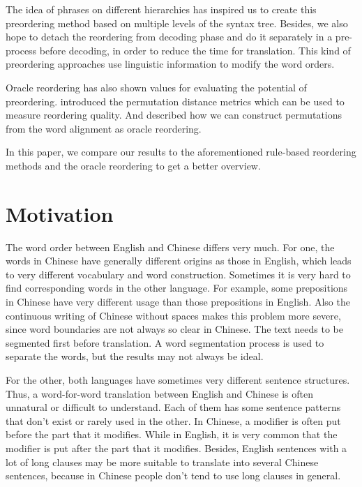 \documentclass[a4paper]{article}
\begin{document}
The idea of phrases on different hierarchies has inspired us to create this preordering method based on multiple levels of the syntax tree. Besides, we also hope to detach the reordering from decoding phase and do it separately in a pre-process before decoding, in order to reduce the time for translation. This kind of preordering approaches use linguistic information to modify the word orders.

Oracle reordering has also shown values for evaluating the potential of preordering. \cite{metrics} introduced the permutation distance metrics which can be used to measure reordering quality. And \cite{birch2} described how we can construct permutations from the word alignment as oracle reordering.

In this paper, we compare our results to the aforementioned rule-based reordering methods and the oracle reordering to get a better overview.

\section{Motivation}
\label{mo}

The word order between English and Chinese differs very much. For one, the words in Chinese have generally different origins as those in English, which leads to very different vocabulary and word construction. Sometimes it is very hard to find corresponding words in the other language. For example, some prepositions in Chinese have very different usage than those prepositions in English. Also the continuous writing of Chinese without spaces makes this problem more severe, since word boundaries are not always so clear in Chinese. The text needs to be segmented first before translation. A word segmentation process is used to separate the words, but the results may not always be ideal.

For the other, both languages have sometimes very different sentence structures. Thus, a word-for-word translation between English and Chinese is often unnatural or difficult to understand. Each of them has some sentence patterns that don't exist or rarely used in the other. In Chinese, a modifier is often put before the part that it modifies. While in English, it is very common that the modifier is put after the part that it modifies. Besides, English sentences with a lot of long clauses may be more suitable to translate into several Chinese sentences, because in Chinese people don't tend to use long clauses in general. 
\end{document}
